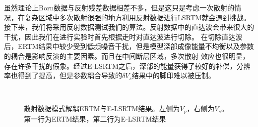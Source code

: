 虽然理论上Born数据与反射残差数据相差不多，但是这只是考虑一次散射的情况，在复杂区域中多次散射很强的地方利用反射数据进行LSRTM就会遇到挑战。
接下来，我们将采用反射数据测试我们的算法。反射数据中的直达波会带来很大的干扰，因此我们在进行实验时首先根据走时对直达波进行切除。
在切除直达波后，ERTM结果中较少受到低频噪音干扰，但是模型深部成像能量不均衡以及参数的耦合是影响反演的主要因素。而且在中间断层区域，多次散射
效应也很明显，存在许多干扰的假象。经过E-LSRTM之后，深部的能量获得了较好的补偿，分辨率也得到了提高，但是参数耦合导致的$\delta
V_s$结果中的脚印难以被压制。
\begin{figure}[!htb]
   \centering
   \\
   \caption{散射数据模式解耦ERTM与E-LSRTM结果。左侧为$V_p$，右侧为$V_s$。第一行为ERTM结果，第二行为E-LSRTM结果}
   \label{fig:LSRTM_1_refl}
\end{figure}

